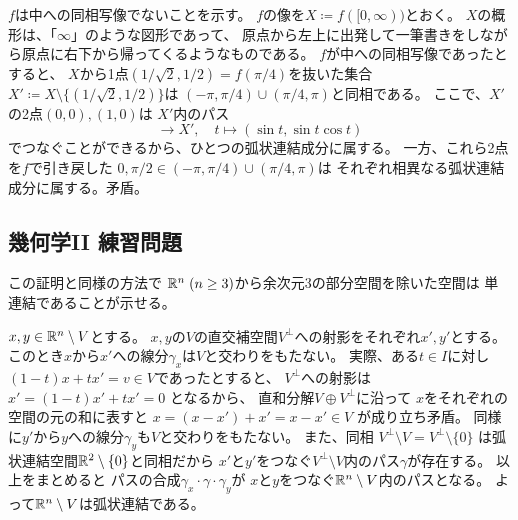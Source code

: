 \documentclass[report]{jlreq}
\begin{document}
\begin{answer}
    $f$は中への同相写像でないことを示す。
    $f$の像を$X \coloneqq f([0, \infty))$とおく。
    $X$の概形は、「$\infty$」のような図形であって、
    原点から左上に出発して一筆書きをしながら原点に右下から帰ってくるようなものである。
    $f$が中への同相写像であったとすると、
    $X$から1点$(1/\sqrt{2}, 1/2) = f(\pi/4)$を抜いた集合
    $X' \coloneqq X \setminus \{(1/\sqrt{2}, 1/2)\}$は
    $(-\pi, \pi/4) \cup (\pi/4, \pi)$と同相である。
    ここで、$X'$の2点$(0, 0), (1, 0)$は
    $X'$内のパス
    \begin{equation}
        [\pi/2, \pi] \to X',\quad
        t \mapsto (\sin t, \sin t \cos t)
    \end{equation}
    でつなぐことができるから、ひとつの弧状連結成分に属する。
    一方、これら2点を$f$で引き戻した
    $0, \pi/2 \in (-\pi, \pi/4) \cup (\pi/4, \pi)$は
    それぞれ相異なる弧状連結成分に属する。矛盾。
\end{answer}

\subsection{幾何学II 練習問題}


\begin{remark}
    この証明と同様の方法で
    $\mathbb{R}^n \; (n \ge 3)$から余次元$3$の部分空間を除いた空間は
    単連結であることが示せる。
\end{remark}

\begin{answer}
    $x, y \in \mathbb{R}^n \setminus V$とする。
    $x, y$の$V$の直交補空間$V^\perp$への射影をそれぞれ$x', y'$とする。
    このとき$x$から$x'$への線分$\gamma_x$は$V$と交わりをもたない。
    実際、ある$t \in I$に対し
    $(1 - t) x + tx' = v \in V$であったとすると、
    $V^\perp$への射影は
    $x' = (1 - t) x' + tx' = 0$
    となるから、
    直和分解$V \oplus V^\perp$に沿って
    $x$をそれぞれの空間の元の和に表すと
    $x = (x - x') + x' = x - x' \in V$
    が成り立ち矛盾。
    同様に$y'$から$y$への線分$\gamma_y$も$V$と交わりをもたない。
    また、同相
    $V^\perp \setminus V = V^\perp \setminus \{ 0 \}$
    は弧状連結空間$\mathbb{R}^2 \setminus \{ 0 \}$と同相だから
    $x'$と$y'$をつなぐ$V^\perp \setminus V$内のパス$\gamma$が存在する。
    以上をまとめると
    パスの合成$\gamma_x \cdot \gamma \cdot \gamma_y$が
    $x$と$y$をつなぐ$\mathbb{R}^n \setminus V$内のパスとなる。
    よって$\mathbb{R}^n \setminus V$は弧状連結である。
\end{answer}
\end{document}
